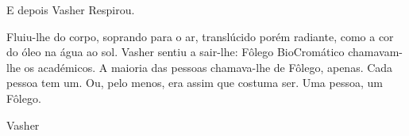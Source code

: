 \documentclass[11pt,a4paper]{book}
\begin{document}
 E depois Vasher Respirou.
 
 Fluiu-lhe do corpo, soprando para o ar, translúcido porém radiante, como a cor do óleo na água ao sol. Vasher sentiu a sair-lhe: Fôlego BioCromático chamavam-lhe os académicos. A maioria das pessoas chamava-lhe de Fôlego, apenas. Cada pessoa tem um. Ou, pelo menos, era assim que costuma ser. Uma pessoa, um Fôlego.
 
 Vasher  
\end{document}
